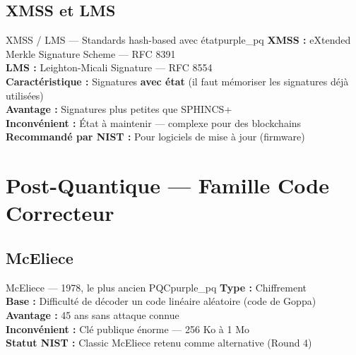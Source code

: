 \documentclass[12pt, a4paper]{article}
\begin{document}
\subsection{XMSS et LMS}

\begin{algobox}{XMSS / LMS --- Standards hash-based avec état}{purple_pq}
\textbf{XMSS :} eXtended Merkle Signature Scheme --- RFC 8391\\
\textbf{LMS :} Leighton-Micali Signature --- RFC 8554\\
\textbf{Caractéristique :} Signatures \textbf{avec état} (il faut mémoriser les signatures déjà utilisées)\\
\textbf{Avantage :} Signatures plus petites que SPHINCS+\\
\textbf{Inconvénient :} État à maintenir --- complexe pour des blockchains\\
\textbf{Recommandé par NIST :} Pour logiciels de mise à jour (firmware)
\end{algobox}

\section{Post-Quantique --- Famille Code Correcteur}

\subsection{McEliece}

\begin{algobox}{McEliece --- 1978, le plus ancien PQC}{purple_pq}
\textbf{Type :} Chiffrement\\
\textbf{Base :} Difficulté de décoder un code linéaire aléatoire (code de Goppa)\\
\textbf{Avantage :} 45 ans sans attaque connue\\
\textbf{Inconvénient :} Clé publique énorme --- 256 Ko à 1 Mo\\
\textbf{Statut NIST :} Classic McEliece retenu comme alternative (Round 4)
\end{algobox}
\end{document}
